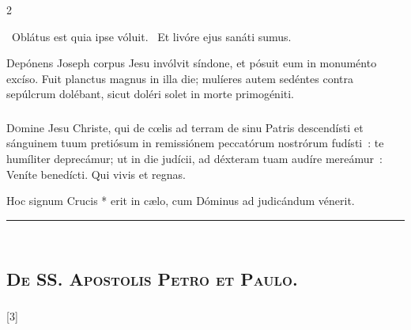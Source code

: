 \documentclass[9pt,twoside]{extarticle}
\begin{document}
\begin{multicols}{2}
{\begin{tightlist}{}
\item {}~Oblátus est quia ipse vóluit. ~Et livóre ejus sanáti sumus.
\item {} Depónens Joseph corpus Jesu invólvit síndone, et pósuit eum in monuménto excíso. Fuit planctus magnus in illa die; mulíeres autem sedéntes contra sepúlcrum dolébant, sicut doléri solet in morte primogéniti.
\end{tightlist}

\subsubsection*{\center{}}
\lettrine{D}omine Jesu Christe, qui de cœlis ad terram de sinu Patris descendísti et sánguinem tuum pretiósum in remissiónem peccatórum nostrórum fudísti~: te humíliter deprecámur; ut in die judícii, ad déxteram tuam audíre mereámur~: Veníte benedícti. Qui vivis et regnas.

\begin{tightlist}{}
\item {}
\item {} Hoc signum Crucis * erit in cælo, cum Dóminus ad judicándum vénerit.
\end{tightlist}

\begin{center}\textcolor{red}{\rule{\linewidth}{0.5pt}} \end{center}

\subsection*{\center {}}
\subsection*{\center \textsc{\\ De SS. Apostolis Petro et Paulo.}}
\subsubsection*{\center {}}

\begin{tightlist}{}
\item {} [3] 
\end{tightlist}

}
\end{multicols}
\end{document}
